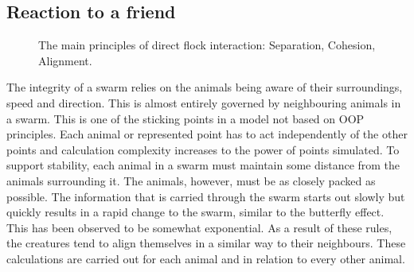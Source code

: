 \documentclass[
reprint,
showpacs,
preprintnumbers,
bibnotes,
amsmath,
amssymb,
aps,
pra,
floatfix,
]{revtex4-1}
\begin{document}
\subsection{\label{sec:boidattraction}Reaction to a friend}

\begin{figure}[!htp]
		\label{fig:boidseparation}
		\label{fig:boidcohesion}
		\label{fig:boidalignment}

	\caption{The main principles of direct flock interaction: Separation, Cohesion, Alignment.\cite{boids}}

	\label{fig:flockinteraction}
\end{figure}

The integrity of a swarm relies on the animals being aware of their surroundings, speed and direction.
This is almost entirely governed by neighbouring animals in a swarm.
This is one of the sticking points in a model not based on OOP principles.
Each animal or represented point has to act independently of the other points and calculation complexity increases to the power of points simulated.
To support stability, each animal in a swarm must maintain some distance from the animals surrounding it.
The animals, however, must be as closely packed as possible.
The information that is carried through the swarm starts out slowly but quickly results in a rapid change to the swarm, similar to the butterfly effect. This has been observed to be somewhat exponential.
As a result of these rules, the creatures tend to align themselves in a similar way to their neighbours.
These calculations are carried out for each animal and in relation to every other animal.
\end{document}
